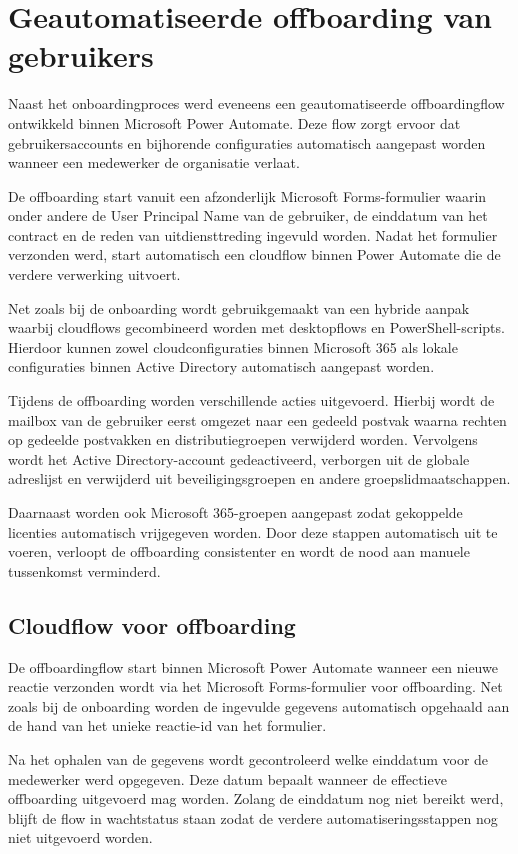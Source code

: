 \section{Geautomatiseerde offboarding van gebruikers}

Naast het onboardingproces werd eveneens een geautomatiseerde offboardingflow ontwikkeld binnen Microsoft Power Automate. Deze flow zorgt ervoor dat gebruikersaccounts en bijhorende configuraties automatisch aangepast worden wanneer een medewerker de organisatie verlaat.

De offboarding start vanuit een afzonderlijk Microsoft Forms-formulier waarin onder andere de User Principal Name van de gebruiker, de einddatum van het contract en de reden van uitdiensttreding ingevuld worden. Nadat het formulier verzonden werd, start automatisch een cloudflow binnen Power Automate die de verdere verwerking uitvoert.

Net zoals bij de onboarding wordt gebruikgemaakt van een hybride aanpak waarbij cloudflows gecombineerd worden met desktopflows en PowerShell-scripts. Hierdoor kunnen zowel cloudconfiguraties binnen Microsoft 365 als lokale configuraties binnen Active Directory automatisch aangepast worden.

Tijdens de offboarding worden verschillende acties uitgevoerd. Hierbij wordt de mailbox van de gebruiker eerst omgezet naar een gedeeld postvak waarna rechten op gedeelde postvakken en distributiegroepen verwijderd worden. Vervolgens wordt het Active Directory-account gedeactiveerd, verborgen uit de globale adreslijst en verwijderd uit beveiligingsgroepen en andere groepslidmaatschappen.

Daarnaast worden ook Microsoft 365-groepen aangepast zodat gekoppelde licenties automatisch vrijgegeven worden. Door deze stappen automatisch uit te voeren, verloopt de offboarding consistenter en wordt de nood aan manuele tussenkomst verminderd.

\subsection{Cloudflow voor offboarding}

De offboardingflow start binnen Microsoft Power Automate wanneer een nieuwe reactie verzonden wordt via het Microsoft Forms-formulier voor offboarding. Net zoals bij de onboarding worden de ingevulde gegevens automatisch opgehaald aan de hand van het unieke reactie-id van het formulier.

Na het ophalen van de gegevens wordt gecontroleerd welke einddatum voor de medewerker werd opgegeven. Deze datum bepaalt wanneer de effectieve offboarding uitgevoerd mag worden. Zolang de einddatum nog niet bereikt werd, blijft de flow in wachtstatus staan zodat de verdere automatiseringsstappen nog niet uitgevoerd worden.


